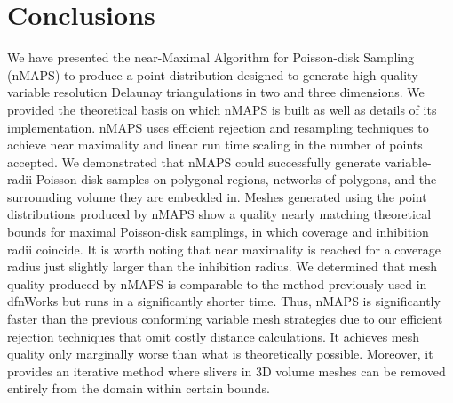 \documentclass[preprint, 10pt]{elsarticle}
\theoremstyle{definition}
\theoremstyle{remark}
\begin{document}
\section{Conclusions}\label{sec:conclusions}
We have presented the near-Maximal Algorithm for Poisson-disk Sampling (nMAPS) to produce a point distribution designed to generate high-quality variable resolution Delaunay triangulations in two and three dimensions.
We provided the theoretical basis on which nMAPS is built as well as details of its implementation. 
nMAPS uses efficient rejection and resampling techniques to achieve near maximality and linear run time scaling in the number of points accepted.
We demonstrated that nMAPS could successfully generate variable-radii Poisson-disk samples on polygonal regions, networks of polygons, and the surrounding volume they are embedded in.
Meshes generated using the point distributions produced by nMAPS show a quality nearly matching theoretical bounds for maximal Poisson-disk samplings, in which coverage and inhibition radii coincide.
It is worth noting that near maximality is reached for a coverage radius just slightly larger than the inhibition radius.
We determined that mesh quality produced by nMAPS is comparable to the method previously used in {\sc dfnWorks} but runs in a significantly shorter time.
Thus, nMAPS is significantly faster than the previous conforming variable mesh strategies due to our efficient rejection techniques that omit costly distance calculations.
It achieves mesh quality only marginally worse than what is theoretically possible. 
Moreover, it provides an iterative method where slivers in 3D volume meshes can be removed entirely from the domain within certain bounds.





\end{document}
